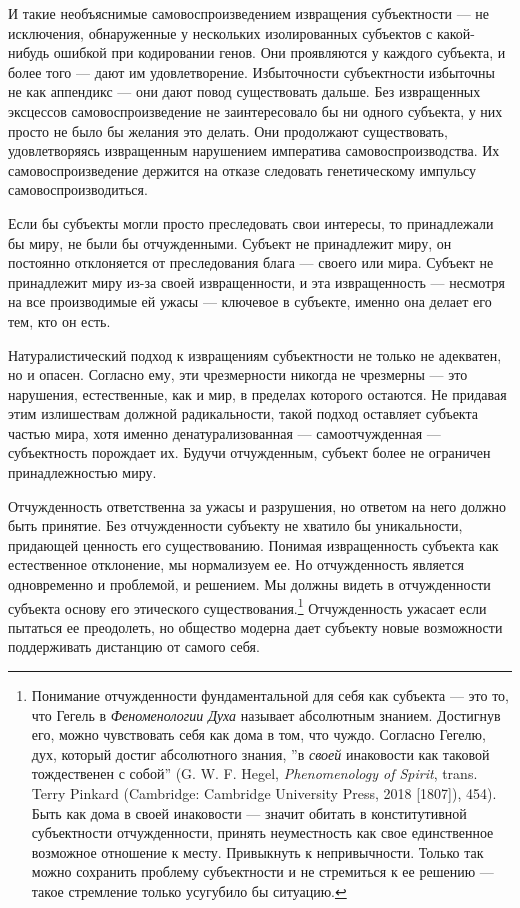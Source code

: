 \documentclass[12pt]{book}
\begin{document}
И такие необъяснимые самовоспроизведением извращения субъектности --- не исключения, обнаруженные у нескольких изолированных субъектов с какой-нибудь ошибкой при кодировании генов. Они проявляются у каждого субъекта, и более того --- дают им удовлетворение. Избыточности субъектности избыточны не как аппендикс --- они дают повод существовать дальше. Без извращенных эксцессов самовоспроизведение не заинтересовало бы ни одного субъекта, у них просто не было бы желания это делать. Они продолжают существовать, удовлетворяясь извращенным нарушением императива самовоспроизводства. Их самовоспроизведение держится на отказе следовать генетическому импульсу самовоспроизводиться.

Если бы субъекты могли просто преследовать свои интересы, то принадлежали бы миру, не были бы отчужденными. Субъект не принадлежит миру, он постоянно отклоняется от преследования блага --- своего или мира. Субъект не принадлежит миру из-за своей извращенности, и эта извращенность --- несмотря на все производимые ей ужасы --- ключевое в субъекте, именно она делает его тем, кто он есть.

Натуралистический подход к извращениям субъектности не только не адекватен, но и опасен. Согласно ему, эти чрезмерности никогда не чрезмерны --- это нарушения, естественные, как и мир, в пределах которого остаются. Не придавая этим излишествам должной радикальности, такой подход оставляет субъекта частью мира, хотя именно денатурализованная --- самоотчужденная --- субъектность порождает их. Будучи отчужденным, субъект более не ограничен принадлежностью миру.

Отчужденность ответственна за ужасы и разрушения, но ответом на него должно быть принятие. Без отчужденности субъекту не хватило бы уникальности, придающей ценность его существованию. Понимая извращенность субъекта как естественное отклонение, мы нормализуем ее. Но отчужденность является одновременно и проблемой, и решением. Мы должны видеть в отчужденности субъекта основу его этического существования.\footnote{Понимание отчужденности фундаментальной для себя как субъекта --- это то, что Гегель в \textit{Феноменологии Духа} называет абсолютным знанием. Достигнув его, можно чувствовать себя как дома в том, что чуждо. Согласно Гегелю, дух, который достиг абсолютного знания, ''в \textit{своей} инаковости как таковой тождественен с собой'' (G. W. F. Hegel, \textit{Phenomenology of Spirit}, trans. Terry Pinkard (Cambridge: Cambridge University Press, 2018 [1807]), 454). Быть как дома в своей инаковости --- значит обитать в конститутивной субъектности отчужденности, принять неуместность как свое единственное возможное отношение к месту. Привыкнуть к непривычности. Только так можно сохранить проблему субъектности и не стремиться к ее решению --- такое стремление только усугубило бы ситуацию.} Отчужденность ужасает если пытаться ее преодолеть, но общество модерна дает субъекту новые возможности поддерживать дистанцию от самого себя.
\end{document}
